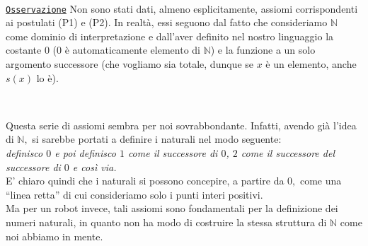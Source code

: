 \par\ \par\noindent
\underline{\texttt{Osservazione}} Non sono stati dati, almeno esplicitamente, assiomi corrispondenti ai postulati (P1) e (P2). In realt\`a, essi seguono dal fatto che consideriamo $\mathbb{N}$ come dominio di interpretazione e dall'aver definito nel nostro linguaggio la costante $0$ ($0$ \`e automaticamente elemento di $\mathbb{N}$) e la funzione a un solo argomento successore (che vogliamo sia totale, dunque se $x$ \`e un elemento, anche $s(x)$ lo \`e).
\par\ \par\noindent

Questa serie di assiomi sembra per noi sovrabbondante. Infatti, avendo gi\`a l'idea di $\mathbb{N},$ si sarebbe portati a definire i naturali nel modo seguente:\\ 
\emph{definisco $0$ e poi definisco $1$ come il successore di $0$, $2$ come il successore del successore di $0$ e cos\`i via.}\\ 
E' chiaro quindi che i naturali si possono concepire, a partire da $0,$ come una "`linea retta"' di cui consideriamo solo i punti interi positivi.\\
Ma per un robot invece, tali assiomi sono fondamentali per la definizione dei numeri naturali, in quanto non ha modo di costruire la stessa struttura di $\mathbb{N}$ come noi abbiamo in mente.\\
